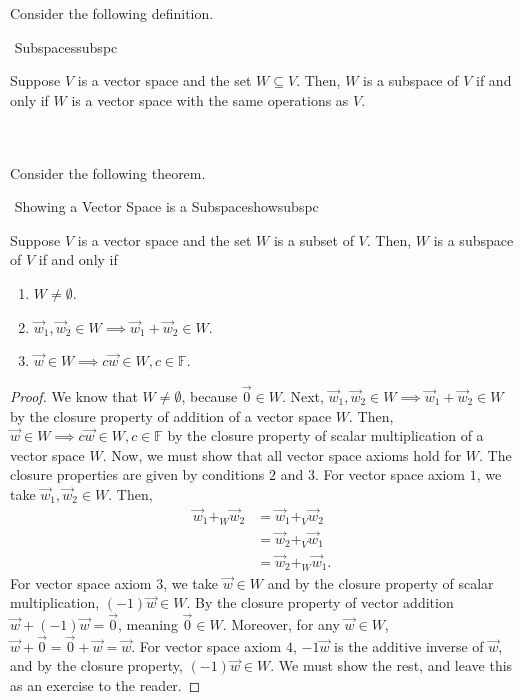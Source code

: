         Consider the following definition.
        \begin{definition}{\Stop\,\,Subspaces}{subspc}

            Suppose \(V\) is a vector space and the set \(W\subseteq V\). Then, \(W\) is a subspace of \(V\) if and only if \(W\) is a vector space with the same operations as \(V\).
            
        \end{definition}
        \vphantom
        \\
        \\
        Consider the following theorem.
        \begin{theorem}{\Stop\,\,Showing a Vector Space is a Subspace}{showsubspc}

            Suppose \(V\) is a vector space and the set \(W\) is a subset of \(V\). Then, \(W\) is a subspace of \(V\) if and only if
            \begin{enumerate}
                \item \(W\neq\emptyset\).
                \item \(\vec{w}_1,\vec{w}_2\in W\implies \vec{w}_1+\vec{w}_2\in W\).
                \item \(\vec{w}\in W\implies c\vec{w}\in W, c\in\mathbb{F}\).
            \end{enumerate}
            \begin{proof}
                We know that \(W\neq\emptyset\), because \(\vec{0}\in W\). Next, \(\vec{w}_1,\vec{w}_2\in W\implies \vec{w}_1+\vec{w}_2\in W\) by the closure property of addition of a vector space \(W\). Then, \(\vec{w}\in W\implies c\vec{w}\in W, c\in\mathbb{F}\) by the closure property of scalar multiplication of a vector space \(W\). Now, we must show that all vector space axioms hold for \(W\). The closure properties are given by conditions \(2\) and \(3\). For vector space axiom \(1\), we take \(\vec{w}_1,\vec{w}_2\in W\). Then,
                \begin{align*}
                    \vec{w}_1+_W\vec{w}_2&=\vec{w}_1+_V\vec{w}_2 \\
                    &=\vec{w}_2+_V\vec{w}_1 \\
                    &=\vec{w}_2+_W\vec{w}_1.
                \end{align*}
                For vector space axiom \(3\), we take \(\vec{w}\in W\) and by the closure property of scalar multiplication, \((-1)\vec{w}\in W\). By the closure property of vector addition \(\vec{w}+(-1)\vec{w}=\vec{0}\), meaning \(\vec{0}\in W\). Moreover, for any \(\vec{w}\in W\), \(\vec{w}+\vec{0}=\vec{0}+\vec{w}=\vec{w}\). For vector space axiom \(4\), \(-1\vec{w}\) is the additive inverse of \(\vec{w}\), and by the closure property, \((-1)\vec{w}\in W\). We must show the rest, and leave this as an exercise to the reader.
            \end{proof}
        \end{theorem}
